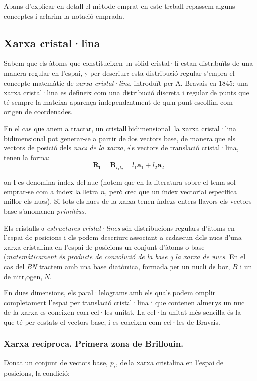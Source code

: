 \documentclass[12pt]{article} %
\let\vec\mathbf %
\begin{document}
Abans d'explicar en detall el mètode emprat en este treball repassem alguns conceptes i aclarim la notació emprada.

\subsection{Xarxa cristal·lina}

Sabem que els àtoms que constitueixen un sòlid cristal·lí estan distribuïts de una manera regular en l'espai, y per descriure esta distribució regular s'empra el concepte matemàtic de \emph{xarxa cristal·lina}, introduït per A. Bravais en 1845: una xarxa cristal·lina es defineix com una distribució discreta i regular de punts que té sempre la mateixa aparença independentment de quin punt escollim com origen de coordenades.

En el cas que anem a tractar, un cristall bidimensional, la xarxa cristal·lina bidimensional pot generar-se a partir de dos vectors base, de manera que els vectors de posició dels \emph{nucs de la xarxa}, els vectors de translació cristal·lina,  tenen la forma:
\begin{equation}
 \vec R_\vec l=\vec R_{l_1 l_2}=l_1 \vec a_1 +l_2\vec a_2
\end{equation}

on $\vec l$ es denomina índex del nuc (notem que en la literatura sobre el tema sol emprar-se com a índex la lletra $n$, però crec que un índex vectorial especifica millor els nucs). Si tots els nucs de la xarxa tenen índexs enters llavors els vectors base s'anomenen \emph{primitius}.

Els cristalls o \emph{estructures cristal·lines} són distribucions regulars d'àtoms en l'espai de posicions i els podem descriure associant a cadascun dels nucs d'una xarxa cristallina en l'espai de posicions un conjunt d'àtoms o base (\emph{matemàticament és producte de convolució de la base y la xarxa de nucs}. En el cas del \emph{BN} tractem amb una base diatòmica, formada per un nucli de bor, $B$ i un de nitr,ogen, $N$. 

En dues dimensions, els paral·lelograms amb els quals podem omplir completament l'espai per translació cristal·lina i que contenen almenys un nuc de la xarxa es coneixen com cel·les unitat. La cel·la unitat més sencilla és la que té per costats el vectors base, i es coneixen com cel·les de Bravais.

\subsubsection{Xarxa recíproca. Primera zona de Brillouin.}
Donat un conjunt de vectors base, $p_i$, de la xarxa cristalina en l'espai de posicions, la condició:
\end{document}
